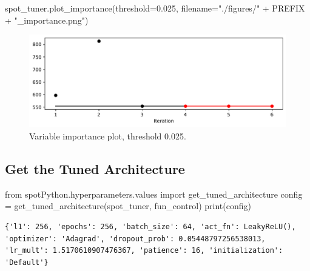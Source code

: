 \documentclass[
  letterpaper,
  DIV=11,
  numbers=noendperiod]{scrreprt}
\newenvironment{Shaded}{\begin{snugshade}}{\end{snugshade}}
\newcommand{\BuiltInTok}[1]{\textcolor[rgb]{0.00,0.23,0.31}{#1}}
\newcommand{\FloatTok}[1]{\textcolor[rgb]{0.68,0.00,0.00}{#1}}
\newcommand{\ImportTok}[1]{\textcolor[rgb]{0.00,0.46,0.62}{#1}}
\newcommand{\NormalTok}[1]{\textcolor[rgb]{0.00,0.23,0.31}{#1}}
\newcommand{\OperatorTok}[1]{\textcolor[rgb]{0.37,0.37,0.37}{#1}}
\newcommand{\StringTok}[1]{\textcolor[rgb]{0.13,0.47,0.30}{#1}}
\begin{document}
\begin{Shaded}
\begin{Highlighting}[]
\NormalTok{spot\_tuner.plot\_importance(threshold}\OperatorTok{=}\FloatTok{0.025}\NormalTok{,}
\NormalTok{    filename}\OperatorTok{=}\StringTok{"./figures/"} \OperatorTok{+}\NormalTok{ PREFIX }\OperatorTok{+} \StringTok{"\_importance.png"}\NormalTok{)}
\end{Highlighting}
\end{Shaded}

\begin{figure}[H]

{\centering \includegraphics{033_spot_lightning_linear_sensitive_files/figure-pdf/cell-17-output-1.pdf}

}

\caption{Variable importance plot, threshold 0.025.}

\end{figure}%

\subsection{Get the Tuned Architecture}\label{sec-get-spot-results-33}

\begin{Shaded}
\begin{Highlighting}[]
\ImportTok{from}\NormalTok{ spotPython.hyperparameters.values }\ImportTok{import}\NormalTok{ get\_tuned\_architecture}
\NormalTok{config }\OperatorTok{=}\NormalTok{ get\_tuned\_architecture(spot\_tuner, fun\_control)}
\BuiltInTok{print}\NormalTok{(config)}
\end{Highlighting}
\end{Shaded}

\begin{verbatim}
{'l1': 256, 'epochs': 256, 'batch_size': 64, 'act_fn': LeakyReLU(), 'optimizer': 'Adagrad', 'dropout_prob': 0.05448797256538013, 'lr_mult': 1.5170610907476367, 'patience': 16, 'initialization': 'Default'}
\end{verbatim}
\end{document}

